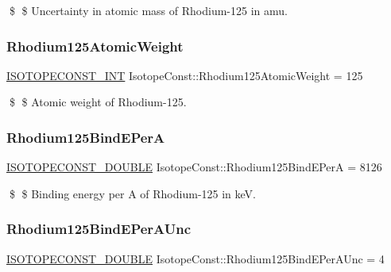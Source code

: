 \$ \$ Uncertainty in atomic mass of Rhodium-\/125 in amu. \mbox{\label{group___isotope_const-_rhodium-_rh125_ga1e86bbfc538af6fb6dc6b40d3a3bd93b}} 
\subsubsection{\texorpdfstring{Rhodium125\+Atomic\+Weight}{Rhodium125AtomicWeight}}
{\footnotesize\ttfamily \mbox{\hyperlink{group___isotope_const-_macros_ga5f18360b3e99483a35c32d789e62621c}{I\+S\+O\+T\+O\+P\+E\+C\+O\+N\+S\+T\+\_\+\+I\+NT}} Isotope\+Const\+::\+Rhodium125\+Atomic\+Weight = 125}

\$ \$ Atomic weight of Rhodium-\/125. \mbox{\label{group___isotope_const-_rhodium-_rh125_ga80188aa5f7aea6367038517f8219ece1}} 
\subsubsection{\texorpdfstring{Rhodium125\+Bind\+E\+PerA}{Rhodium125BindEPerA}}
{\footnotesize\ttfamily \mbox{\hyperlink{group___isotope_const-_macros_ga8f45a7272ce02c0b4c65c44636ed719a}{I\+S\+O\+T\+O\+P\+E\+C\+O\+N\+S\+T\+\_\+\+D\+O\+U\+B\+LE}} Isotope\+Const\+::\+Rhodium125\+Bind\+E\+PerA = 8126}

\$ \$ Binding energy per A of Rhodium-\/125 in keV. \mbox{\label{group___isotope_const-_rhodium-_rh125_gaeb57fb59d9566f4cee49a97dc64d1272}} 
\subsubsection{\texorpdfstring{Rhodium125\+Bind\+E\+Per\+A\+Unc}{Rhodium125BindEPerAUnc}}
{\footnotesize\ttfamily \mbox{\hyperlink{group___isotope_const-_macros_ga8f45a7272ce02c0b4c65c44636ed719a}{I\+S\+O\+T\+O\+P\+E\+C\+O\+N\+S\+T\+\_\+\+D\+O\+U\+B\+LE}} Isotope\+Const\+::\+Rhodium125\+Bind\+E\+Per\+A\+Unc = 4}

